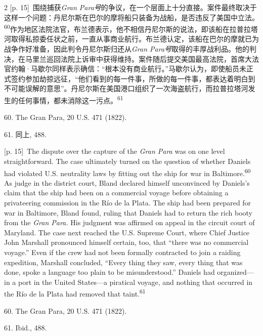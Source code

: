 \documentclass[10pt,a4paper]{article}
\begin{document}
\begin{paracol}{2}
{\scriptsize\color{gray} [p. 15]}\ 围绕捕获\textit{Gran Para号}的争议，在一个层面上十分直接。案件最终取决于这样一个问题：丹尼尔斯在巴尔的摩将船只装备为战船，是否违反了美国中立\mbox{法。\textsuperscript{60}}作为地区法院法官，布兰德表示，他不相信丹尼尔斯的说法，即该船在拉普拉塔河取得私掠委任状之前，一直从事商业航行。布兰德认定，该船在巴尔的摩就已为战争作好准备，因此判令丹尼尔斯归还从\textit{Gran Para号}取得的丰厚战利品。他的判决，在马里兰巡回法院上诉审中获得维持。案件随后提交美国最高法院，首席大法官约翰·马歇尔同样表示确信：“根本没有商业航行。”马歇尔认为，即使船员未正式签约参加劫掠远征，“他们看到的每一件事，所做的每一件事，都表达着明白到不可能误解的意思”。丹尼尔斯在美国港口组织了一次海盗航行，而拉普拉塔河发生的任何事情，都未消除这一污\mbox{点。\textsuperscript{61}}\par{\small 60. The Gran Para, 20 U.S. 471 (1822).\par}{\small 61. 同上, 488.\par}
\switchcolumn
{\scriptsize\color{gray} [p. 15]}\ The dispute over the capture of the \textit{Gran Para} was on one level straightforward. The case ultimately turned on the question of whether Daniels had violated U.S. neutrality laws by fitting out the ship for war in Baltimore.\nobreak\textsuperscript{60} As judge in the district court, Bland declared himself unconvinced by Daniels’s claim that the ship had been on a commercial voyage before obtaining a privateering commission in the Río de la Plata. The ship had been prepared for war in Baltimore, Bland found, ruling that Daniels had to return the rich booty from the \textit{Gran Para.} His judgment was affirmed on appeal in the circuit court of Maryland. The case next reached the U.S. Supreme Court, where Chief Justice John Marshall pronounced himself certain, too, that “there was no commercial voyage.” Even if the crew had not been formally contracted to join a raiding expedition, Marshall concluded, “Every thing they saw, every thing that was done, spoke a language too plain to be misunderstood.” Daniels had organized—in a port in the United States—a piratical voyage, and nothing that occurred in the Río de la Plata had removed that taint.\nobreak\textsuperscript{61}\par{\small 60. The Gran Para, 20 U.S. 471 (1822).\par}{\small 61. Ibid., 488.\par}
\switchcolumn*

\end{paracol}
\end{document}
